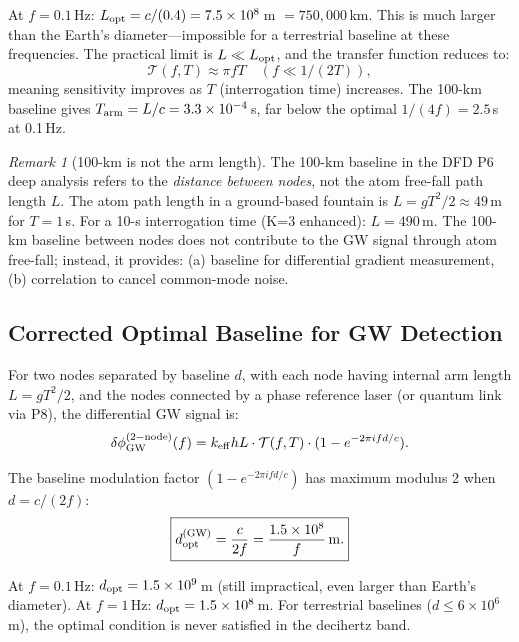 \documentclass[11pt]{article}
\theoremstyle{definition}
\theoremstyle{remark}
\newtheorem{remark}[theorem]{Remark}
\begin{document}
At $f = 0.1$\,Hz: $L_{\rm opt} = c/(0.4) = 7.5\times10^8$\,m $= 750,000$\,km.
This is much larger than the Earth's diameter---impossible for a terrestrial
baseline at these frequencies. The practical limit is $L \ll L_{\rm opt}$,
and the transfer function reduces to:
\begin{equation}
\mathcal{T}(f, T) \approx \pi f T \quad (f \ll 1/(2T)),
\end{equation}
meaning sensitivity improves as $T$ (interrogation time) increases. The
100-km baseline gives $T_{\rm arm} = L/c = 3.3\times10^{-4}$\,s, far below
the optimal $1/(4f) = 2.5$\,s at 0.1\,Hz.

\begin{remark}[100-km is not the arm length]
The 100-km baseline in the DFD P6 deep analysis refers to the \emph{distance
between nodes}, not the atom free-fall path length $L$. The atom path length
in a ground-based fountain is $L = gT^2/2 \approx 49$\,m for $T=1$\,s. For
a 10-s interrogation time (K=3 enhanced): $L = 490$\,m. The 100-km baseline
between nodes does not contribute to the GW signal through atom free-fall;
instead, it provides: (a) baseline for differential gradient measurement,
(b) correlation to cancel common-mode noise.
\end{remark}

\subsection{Corrected Optimal Baseline for GW Detection}

For two nodes separated by baseline $d$, with each node having internal arm
length $L = gT^2/2$, and the nodes connected by a phase reference laser
(or quantum link via P8), the differential GW signal is:
\begin{equation}
\delta\phi_{\rm GW}^{(2-\rm node)}(f) = k_{\rm eff} h L \cdot \mathcal{T}(f, T)
\cdot (1 - e^{-2\pi i f d/c}).
\end{equation}

The baseline modulation factor $(1 - e^{-2\pi i f d/c})$ has maximum modulus 2
when $d = c/(2f)$:
\begin{equation}
\boxed{d_{\rm opt}^{(\rm GW)} = \frac{c}{2f} = \frac{1.5\times10^8}{f}\,\mathrm{m}.}
\label{eq:d-opt-GW}
\end{equation}

At $f = 0.1$\,Hz: $d_{\rm opt} = 1.5\times10^9$\,m (still impractical, even
larger than Earth's diameter). At $f = 1$\,Hz: $d_{\rm opt} = 1.5\times10^8$\,m.
For terrestrial baselines ($d \leq 6\times10^6$\,m), the optimal condition
is never satisfied in the decihertz band.
\end{document}
